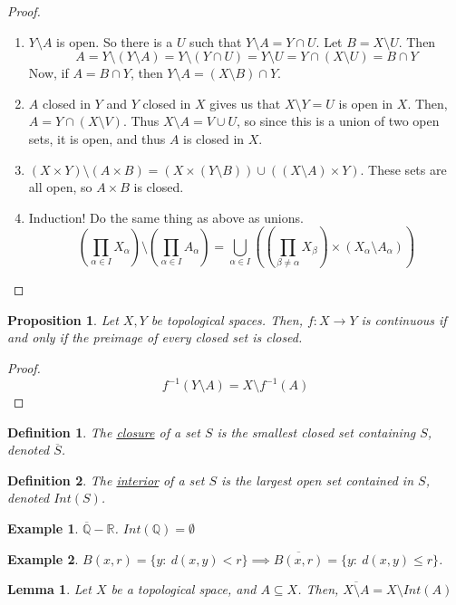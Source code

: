 \documentclass{article}
\newcommand{\R}{\mathbb{R}}
\newcommand{\Q}{\mathbb{Q}}
\newtheorem{example}{Example}
\newtheorem{proposition}{Proposition}
\newtheorem{lemma}{Lemma}
\newtheorem{definition}{Definition}
\begin{document}
 \begin{proof}
 \begin{enumerate}[(1)]
     \item $Y\setminus A$ is open. So there is a $U$ such that $Y\setminus A = Y\cap U$. Let $B=X\setminus U$. Then $$A=Y\setminus (Y\setminus A) = Y\setminus (Y\cap U) = Y\setminus U=Y\cap (X\setminus U)=B\cap Y$$
     Now, if $A=B\cap Y$, then $Y\setminus A=(X\setminus B)\cap Y$.
     \item $A$ closed in $Y$ and $Y$ closed in $X$ gives us that $X\setminus Y=U$ is open in $X$. Then, $A=Y\cap (X\setminus V)$. Thus $X\setminus A = V\cup U$, so since this is a union of two open sets, it is open, and thus $A$ is closed in $X$.
     \item $(X\times Y)\setminus (A\times B)= (X\times (Y\setminus B))\cup ((X\setminus A)\times Y)$. These sets are all open, so $A\times B$ is closed.
     \item Induction! Do the same thing as above as unions.
     $$\displaystyle\left(\prod_{\alpha\in I}X_\alpha\right) \setminus\left(\prod_{\alpha\in I}A_\alpha\right)=\bigcup_{\alpha\in I}\left(\left(\prod_{\beta\neq \alpha}X_\beta\right)\times (X_\alpha\setminus A_\alpha) \right)$$
 \end{enumerate}
 \end{proof}
 \begin{proposition}
 Let $X,Y$ be topological spaces. Then, $f:X\rightarrow Y$ is continuous if and only if the preimage of every closed set is closed.
 \end{proposition}
 \begin{proof}
 $$f^{-1}(Y\setminus A)=X\setminus f^{-1}(A)$$
 \end{proof}
 \begin{definition}
 The \underline{closure} of a set $S$ is the smallest closed set containing $S$, denoted $\overline{S}$.
 \end{definition}
 \begin{definition}
 The \underline{interior} of a set $S$ is the largest open set contained in $S$, denoted $Int(S)$.
 \end{definition}
 \begin{example}
 $\overline{\Q}-\R$. $Int(\Q)=\emptyset$
 \end{example}
 \begin{example}
 $B(x,r)=\{y:\ d(x,y)<r\}\implies \overline{B(x,r)}=\{y:\ d(x,y)\leq r\}$.
 \end{example}
 \begin{lemma}
 Let $X$ be a topological space, and $A\subseteq X$. Then, $\overline{X\setminus A}=X\setminus Int(A)$
 \end{lemma}
\end{document}
